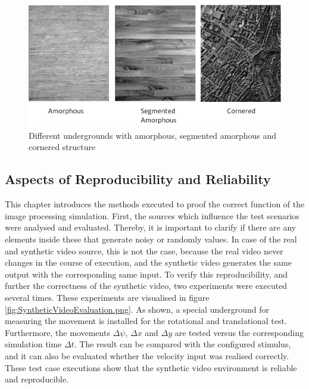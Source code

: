 \begin{figure}[H]
	\centering
		\includegraphics[width=1\textwidth]{graphic/Undergrounds.png}
	\caption{Different undergrounds with amorphous, segmented amorphous and cornered structure}
	\label{fig:Undergrounds.png}
\end{figure}

\subsection{Aspects of Reproducibility and Reliability}
\label{mt:c:expResults:ReproducibilityReliability}
This chapter introduces the methods executed to proof the correct function of the image processing simulation.
First, the sources which influence the test scenarios were analysed and evaluated. Thereby, it is important to clarify if there
are any elements inside these that generate noisy or randomly values. In case of the real and synthetic video source, this is not the case, because the 
real video never changes in the course of execution, and the synthetic video generates the same output with the corresponding same input.
To verify this reproducibility, and further the correctness of the synthetic video, two experiments were executed several times. These experiments are visualised in figure \ref{fig:SyntheticVideoEvaluation.png}. As shown, a special underground for measuring the movement is installed for the rotational and translational test. Furthermore, the movements \ensuremath{\Delta \psi}, \ensuremath{\Delta x} and 
\ensuremath{\Delta y} are tested versus the corresponding simulation time \ensuremath{\Delta t}. The result can be compared with the configured stimulus, and it can also be evaluated whether the velocity input was realised correctly. These test case executions show that the synthetic video environment is reliable and reproducible.

